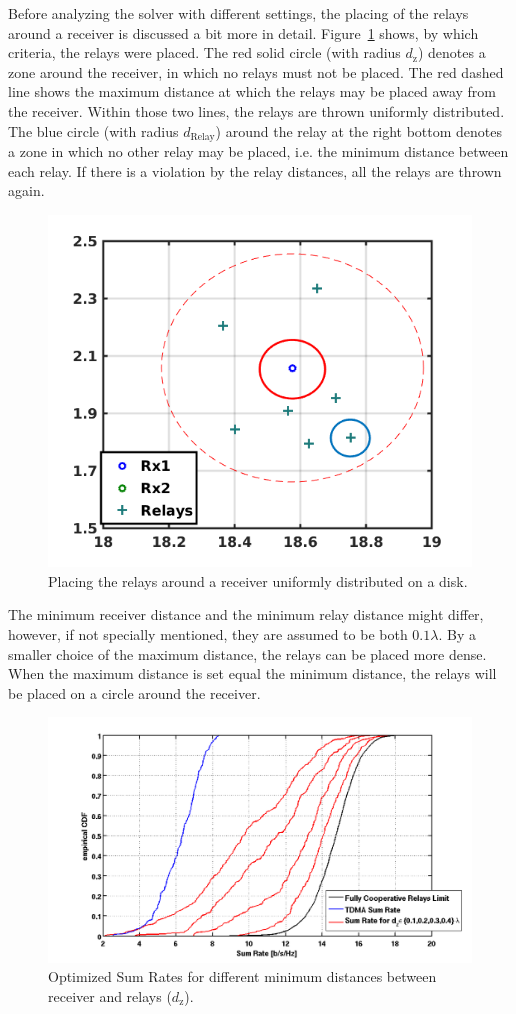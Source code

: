 Before analyzing the solver with different settings, the placing of the relays around a receiver is discussed a bit more in detail.
Figure~\ref{fig:cloud} shows, by which criteria, the relays were placed.
The red solid circle (with radius $d_\text{z}$) denotes a zone around the receiver, in which no relays must not be placed.
The red dashed line shows the maximum distance at which the relays may be placed away from the receiver. 
Within those two lines, the relays are thrown uniformly distributed.
The blue circle (with radius $d_\text{Relay}$) around the relay at the right bottom denotes a zone in which no other relay may be placed, i.e. the minimum distance between each relay.
If there is a violation by the relay distances, all the relays are thrown again.
\begin{figure}[h]
\centering
  \includegraphics[width=0.7\linewidth]{images/cloud.png}
\caption{Placing the relays around a receiver uniformly distributed on a disk.}
\label{fig:cloud}
\end{figure}

The minimum receiver distance and the minimum relay distance might differ, however, if not specially mentioned, they are assumed to be both $0.1\lambda$.
By a smaller choice of the maximum distance, the relays can be placed more dense.
When the maximum distance is set equal the minimum distance, the relays will be placed on a circle around the receiver.
\begin{figure}[h]
\centering
  \includegraphics[width=0.9\linewidth]{images/Dzcomparison.png}
\caption{Optimized Sum Rates for different minimum distances between receiver and relays ($d_\text{z}$).}
\label{fig:dz_comparison}
\end{figure}

